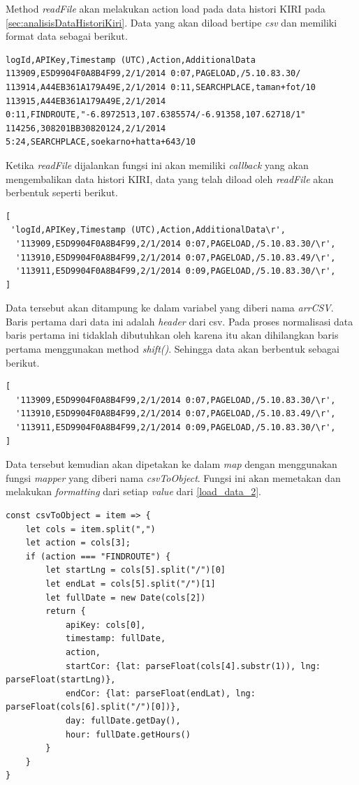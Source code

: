\begin{enumerate}
Method \textit{readFile} akan melakukan action load pada data histori KIRI pada \ref{sec:analisisDataHistoriKiri}. Data yang akan diload bertipe \textit{csv} dan memiliki format data sebagai berikut.
\begin{lstlisting}[label=Kiri_Histori_Data, caption=Histori Data KIRI]
logId,APIKey,Timestamp (UTC),Action,AdditionalData
113909,E5D9904F0A8B4F99,2/1/2014 0:07,PAGELOAD,/5.10.83.30/
113914,A44EB361A179A49E,2/1/2014 0:11,SEARCHPLACE,taman+fot/10
113915,A44EB361A179A49E,2/1/2014 0:11,FINDROUTE,"-6.8972513,107.6385574/-6.91358,107.62718/1"
114256,308201BB30820124,2/1/2014 5:24,SEARCHPLACE,soekarno+hatta+643/10
\end{lstlisting}
Ketika \textit{readFile} dijalankan fungsi ini akan memiliki \textit{callback} yang akan mengembalikan data histori KIRI, data yang telah diload oleh \textit{readFile} akan berbentuk seperti berikut. 
\begin{lstlisting}[label=load_data_1 , caption=Raw Data]
[
 'logId,APIKey,Timestamp (UTC),Action,AdditionalData\r',
  '113909,E5D9904F0A8B4F99,2/1/2014 0:07,PAGELOAD,/5.10.83.30/\r',
  '113910,E5D9904F0A8B4F99,2/1/2014 0:07,PAGELOAD,/5.10.83.49/\r',
  '113911,E5D9904F0A8B4F99,2/1/2014 0:09,PAGELOAD,/5.10.83.30/\r',
]
\end{lstlisting}
Data tersebut akan ditampung ke dalam variabel yang diberi nama \textit{arrCSV}. Baris pertama dari data ini adalah \textit{header} dari csv. Pada proses normalisasi data baris pertama ini tidaklah dibutuhkan oleh karena itu akan dihilangkan baris pertama menggunakan method \textit{shift()}. Sehingga data akan berbentuk sebagai berikut.
\begin{lstlisting}[label=load_data_2 , caption=Raw Data 2]
[
  '113909,E5D9904F0A8B4F99,2/1/2014 0:07,PAGELOAD,/5.10.83.30/\r',
  '113910,E5D9904F0A8B4F99,2/1/2014 0:07,PAGELOAD,/5.10.83.49/\r',
  '113911,E5D9904F0A8B4F99,2/1/2014 0:09,PAGELOAD,/5.10.83.30/\r',
]
\end{lstlisting}
Data tersebut kemudian akan dipetakan ke dalam \textit{map} dengan menggunakan fungsi \textit{mapper} yang diberi nama \textit{csvToObject}. Fungsi ini akan memetakan dan melakukan \textit{formatting} dari setiap \textit{value} dari \ref{load_data_2}.

\begin{lstlisting}[label=helper_1 , caption=CSV Mapper]
const csvToObject = item => {
    let cols = item.split(",")
    let action = cols[3];
    if (action === "FINDROUTE") {
        let startLng = cols[5].split("/")[0]
        let endLat = cols[5].split("/")[1]
        let fullDate = new Date(cols[2])
        return {
            apiKey: cols[0],
            timestamp: fullDate,
            action,
            startCor: {lat: parseFloat(cols[4].substr(1)), lng: parseFloat(startLng)},
            endCor: {lat: parseFloat(endLat), lng: parseFloat(cols[6].split("/")[0])},
            day: fullDate.getDay(),
            hour: fullDate.getHours()
        }
    }
}
\end{lstlisting}


\end{enumerate}
